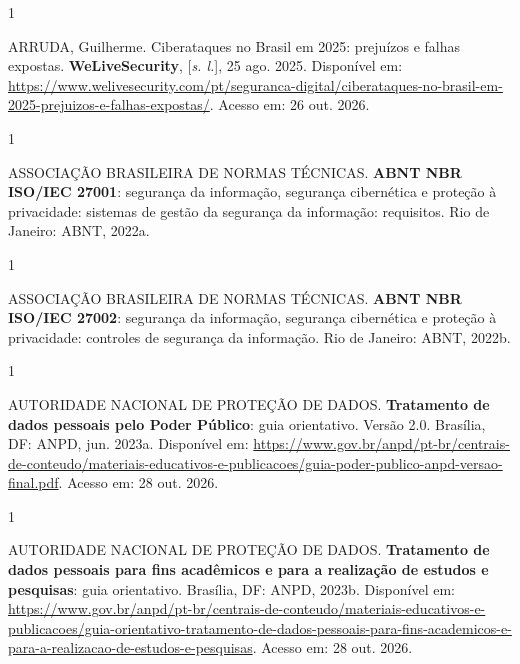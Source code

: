 \documentclass[12pt,a4paper]{article}
\begin{document}
\vspace{6pt}
\begin{spacing}{1}\raggedright\noindent ARRUDA, Guilherme. Ciberataques no Brasil em 2025: prejuízos e falhas expostas. \textbf{WeLiveSecurity}, [\textit{s. l.}], 25 ago. 2025. Disponível em: \url{https://www.welivesecurity.com/pt/seguranca-digital/ciberataques-no-brasil-em-2025-prejuizos-e-falhas-expostas/}. Acesso em: 26 out. 2026.\par\vspace{12pt}\end{spacing}
\begin{spacing}{1}\raggedright\noindent ASSOCIAÇÃO BRASILEIRA DE NORMAS TÉCNICAS. \textbf{ABNT NBR ISO/IEC 27001}: segurança da informação, segurança cibernética e proteção à privacidade: sistemas de gestão da segurança da informação: requisitos. Rio de Janeiro: ABNT, 2022a.\par\vspace{12pt}\end{spacing}
\begin{spacing}{1}\raggedright\noindent ASSOCIAÇÃO BRASILEIRA DE NORMAS TÉCNICAS. \textbf{ABNT NBR ISO/IEC 27002}: segurança da informação, segurança cibernética e proteção à privacidade: controles de segurança da informação. Rio de Janeiro: ABNT, 2022b.\par\vspace{12pt}\end{spacing}
\begin{spacing}{1}\raggedright\noindent AUTORIDADE NACIONAL DE PROTEÇÃO DE DADOS. \textbf{Tratamento de dados pessoais pelo Poder Público}: guia orientativo. Versão 2.0. Brasília, DF: ANPD, jun. 2023a. Disponível em: \url{https://www.gov.br/anpd/pt-br/centrais-de-conteudo/materiais-educativos-e-publicacoes/guia-poder-publico-anpd-versao-final.pdf}. Acesso em: 28 out. 2026.\par\vspace{12pt}\end{spacing}
\begin{spacing}{1}\raggedright\noindent AUTORIDADE NACIONAL DE PROTEÇÃO DE DADOS. \textbf{Tratamento de dados pessoais para fins acadêmicos e para a realização de estudos e pesquisas}: guia orientativo. Brasília, DF: ANPD, 2023b. Disponível em: \url{https://www.gov.br/anpd/pt-br/centrais-de-conteudo/materiais-educativos-e-publicacoes/guia-orientativo-tratamento-de-dados-pessoais-para-fins-academicos-e-para-a-realizacao-de-estudos-e-pesquisas}. Acesso em: 28 out. 2026.\par\vspace{12pt}\end{spacing}
\end{document}
